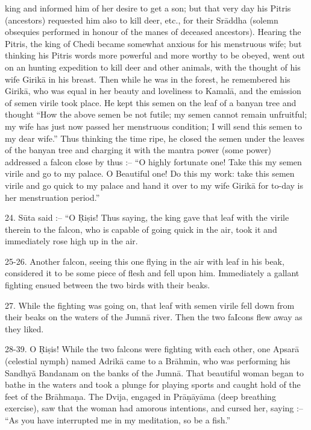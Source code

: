 king and informed him of her desire to get a son; but that very day his Pitris (ancestors) requested him also to kill deer, etc., for their Sr\=addha (solemn obsequies performed in honour of the manes of deceased ancestors). Hearing the Pitris, the king of Chedi became somewhat anxious for his menstruous wife; but thinking his Pitris words more powerful and more worthy to be obeyed, went out on an hunting expedition to kill deer and other animals, with the thought of his wife Girik\=a in his breast. Then while he was in the forest, he remembered his Girik\=a, who was equal in her beauty and loveliness to Kamal\=a, and the emission of semen virile took place. He kept this semen on the leaf of a banyan tree and thought ``How the above semen be not futile; my semen cannot remain unfruitful; my wife has just now passed her menstruous condition; I will send this semen to my dear wife.'' Thus thinking the time ripe, he closed the semen under the leaves of the banyan tree and charging it with the mantra power (some power) addressed a falcon close by thus :-- ``O highly fortunate one! Take this my semen virile and go to my palace. O Beautiful one! Do this my work: take this semen virile and go quick to my palace and hand it over to my wife Girik\=a for to-day is her menstruation period.''

24. S\=uta said :-- ``O \d{R}i\d{s}is! Thus saying, the king gave that leaf with the virile therein to the falcon, who is capable of going quick in the air, took it and immediately rose high up in the air.

25-26. Another falcon, seeing this one flying in the air with leaf in his beak, considered it to be some piece of flesh and fell upon him. Immediately a gallant fighting ensued between the two birds with their beaks.

27. While the fighting was going on, that leaf with semen virile fell down from their beaks on the waters of the Jumn\=a river. Then the two faIcons flew away as they liked.

28-39. O \d{R}i\d{s}is! While the two falcons were fighting with each other, one Apsar\=a (celestial nymph) named Adrik\=a came to a Br\=ahmin, who was performing his Sandhy\=a Bandanam on the banks of the Jumn\=a. That beautiful woman began to bathe in the waters and took a plunge for playing sports and caught hold of the feet of the Br\=ahma\d{n}a. The Dvija, engaged in Pr\=a\d{n}\=ay\=ama (deep breathing exercise), saw that the woman had amorous intentions, and cursed her, saying :-- ``As you have interrupted me in my meditation, so be a fish.''

